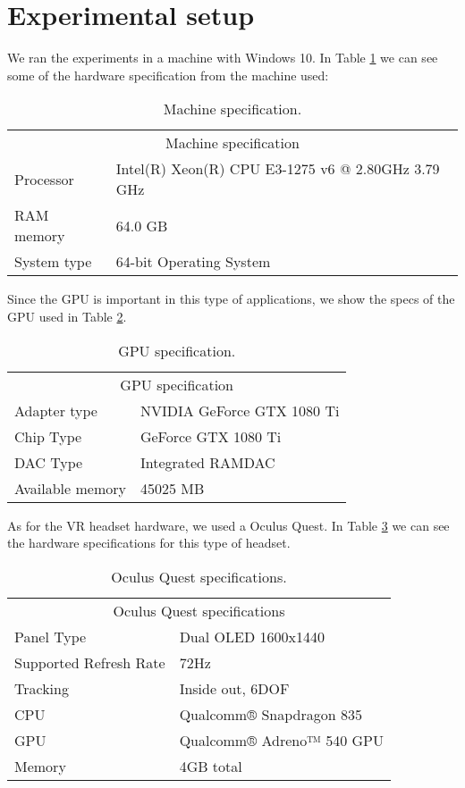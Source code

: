 \section{Experimental setup}
We ran the experiments in a machine with Windows 10. In Table \ref{tab:machine-specs} we can see some of the hardware specification from the machine used:
\begin{table}[h!]
\centering
\begin{tabular}{ll}
\multicolumn{2}{c}{Machine specification}                        \\
Processor   & Intel(R) Xeon(R) CPU E3-1275 v6 @ 2.80GHz 3.79 GHz \\
RAM memory  & 64.0 GB                                            \\
System type & 64-bit Operating System
\end{tabular}
\caption{Machine specification.}
\label{tab:machine-specs}
\end{table}

Since the GPU is important in this type of applications, we show the specs of the GPU used in Table \ref{tab:gpu-specs}.

\begin{table}[h!]
\centering
\begin{tabular}{ll}
\multicolumn{2}{c}{GPU specification} \\
Adapter type   & NVIDIA GeForce GTX 1080 Ti \\
Chip Type  &  GeForce GTX 1080 Ti \\
DAC Type & Integrated RAMDAC \\
Available memory & 45025 MB
\end{tabular}
\caption{GPU specification.}
\label{tab:gpu-specs}
\end{table}


As for the VR headset hardware, we used a Oculus Quest. In Table \ref{tab:oculus-specs} we can see the hardware specifications for this type of headset.

\begin{table}[h!]
\centering
\begin{tabular}{ll}
\multicolumn{2}{c}{Oculus Quest specifications} \\
Panel Type   & Dual OLED 1600x1440 \\
Supported Refresh Rate  &  72Hz \\
Tracking & Inside out, 6DOF \\
CPU & Qualcomm® Snapdragon 835 \\
GPU & Qualcomm® Adreno™ 540 GPU \\
Memory & 4GB total
\end{tabular}
\caption{Oculus Quest specifications.}
\label{tab:oculus-specs}
\end{table}

